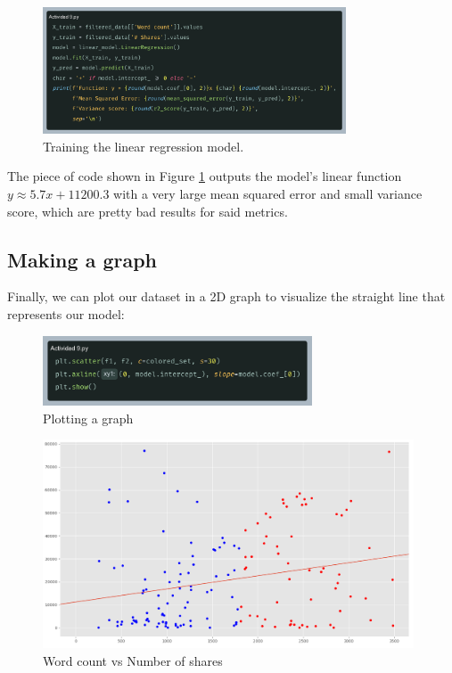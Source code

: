 \documentclass[10pt]{article}
\begin{document}
\begin{figure}[h]
  \centering
  \includegraphics[width=90mm]{2025-03-26-14-53-07.png}
  \caption{Training the linear regression model.}
  \label{fig:training}
\end{figure}

The piece of code shown in Figure \ref{fig:training} outputs the model's linear function $y \approx 5.7x + 11200.3$ with a very large mean squared error and small variance score, which are pretty bad results for said metrics.

\subsection{Making a graph}
Finally, we can plot our dataset in a 2D graph to visualize the straight line that represents our model: \par

\begin{figure}[h]
  \centering
  \includegraphics[width=80mm]{2025-03-26-15-07-35.png}
  \caption{Plotting a graph}
\end{figure}

\newpage

\begin{figure}[h]
  \centering
  \includegraphics[width=110mm]{2025-03-26-15-09-26.png}
  \caption{Word count vs Number of shares}
\end{figure}
\end{document}
